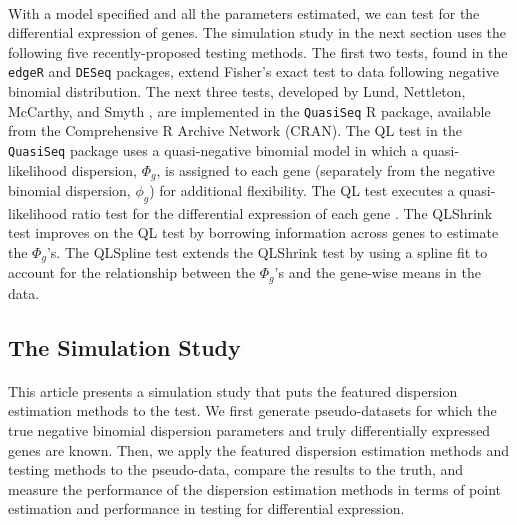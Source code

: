 \documentclass[10pt]{article}
\begin{document}
\paragraph{} \indent With a model specified and all the parameters estimated, we can test for the differential expression of genes. The simulation study in the next section uses the following five recently-proposed testing methods. The first two tests, found in the {\tt edgeR} and {\tt DESeq} packages, extend Fisher's exact test to data following negative binomial distribution. The next three tests, developed by Lund, Nettleton, McCarthy, and Smyth \cite{quasiseq}, are implemented in the {\tt QuasiSeq} R package, available from the Comprehensive R Archive Network (CRAN). The QL test in the {\tt QuasiSeq} package uses a quasi-negative binomial model in which a quasi-likelihood dispersion, $\Phi_g$, is assigned to each gene (separately from the negative binomial dispersion, $\phi_g$) for additional flexibility. The QL test executes a quasi-likelihood ratio test for the differential expression of each gene %
. The QLShrink test improves on the QL test by borrowing information across genes to estimate the $\Phi_g$'s. The QLSpline test extends the QLShrink test by using a spline fit to account for the relationship between the $\Phi_g$'s and the gene-wise means in the data.









\subsection*{The Simulation Study}

\paragraph{} \indent This article presents a simulation study that puts the featured dispersion estimation methods to the test. We first generate pseudo-datasets for which the true negative binomial dispersion parameters and truly differentially expressed genes are known. Then, we apply the featured dispersion estimation methods and testing methods to the pseudo-data, compare the results to the truth, and measure the performance of the dispersion estimation methods in terms of point estimation and performance in testing for differential expression. %
\end{document}
